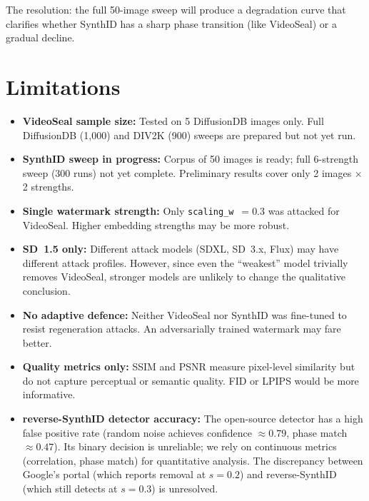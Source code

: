 \documentclass[11pt,a4paper]{article}
\begin{document}
The resolution: the full 50-image sweep will produce a degradation curve
that clarifies whether SynthID has a sharp phase transition (like
VideoSeal) or a gradual decline.

\section{Limitations}
\label{sec:limitations}

\begin{itemize}
    \item \textbf{VideoSeal sample size:} Tested on 5 DiffusionDB images
    only. Full DiffusionDB (1{,}000) and DIV2K (900) sweeps are prepared
    but not yet run.
    \item \textbf{SynthID sweep in progress:} Corpus of 50 images is
    ready; full 6-strength sweep (300 runs) not yet complete. Preliminary
    results cover only 2 images $\times$ 2 strengths.
    \item \textbf{Single watermark strength:} Only
    \texttt{scaling\_w}~$= 0.3$ was attacked for VideoSeal. Higher
    embedding strengths may be more robust.
    \item \textbf{SD~1.5 only:} Different attack models (SDXL, SD~3.x,
    Flux) may have different attack profiles. However, since even the
    ``weakest'' model trivially removes VideoSeal, stronger models are
    unlikely to change the qualitative conclusion.
    \item \textbf{No adaptive defence:} Neither VideoSeal nor SynthID
    was fine-tuned to resist regeneration attacks. An adversarially
    trained watermark may fare better.
    \item \textbf{Quality metrics only:} SSIM and PSNR measure
    pixel-level similarity but do not capture perceptual or semantic
    quality. FID or LPIPS would be more informative.
    \item \textbf{reverse-SynthID detector accuracy:} The open-source
    detector has a high false positive rate (random noise achieves
    confidence $\approx 0.79$, phase match $\approx 0.47$). Its binary
    decision is unreliable; we rely on continuous metrics (correlation,
    phase match) for quantitative analysis. The discrepancy between
    Google's portal (which reports removal at $s = 0.2$) and
    reverse-SynthID (which still detects at $s = 0.3$) is unresolved.
\end{itemize}

\end{document}

